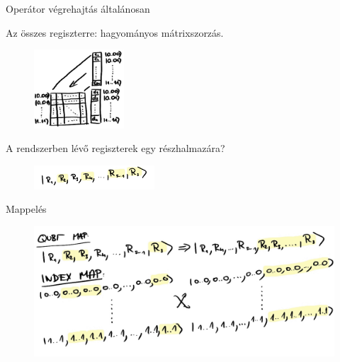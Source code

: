 \documentclass[aspectratio=169]{beamer}
\begin{document}
\begin{frame}{Operátor végrehajtás általánosan}

Az összes regiszterre: hagyományos mátrixszorzás.

\vspace{-0.4cm}
\begin{figure}[H]
    \centering
    \includegraphics[width=0.3\textwidth]{figures/hagyomanyos_matrixszorzas.png}
\end{figure}

A rendszerben lévő regiszterek egy részhalmazára?

\begin{figure}[H]
    \centering
    \includegraphics[width=0.4\textwidth]{figures/celregiszterek.png}
\end{figure}

\end{frame}


\begin{frame}{Mappelés}

\begin{figure}[H]
    \centering
    \includegraphics[width=\textwidth]{figures/mappeles.png}
\end{figure}

\end{frame}
\end{document}
